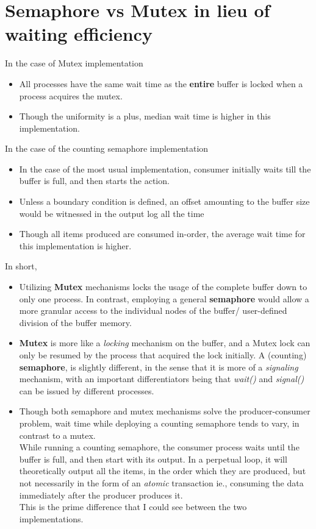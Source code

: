 \documentclass{article}
\begin{document}
\section{Semaphore vs Mutex in lieu of waiting efficiency}
In the case of Mutex implementation
    \begin{itemize}
        \item All processes have the same wait time as the \textbf{entire} buffer is locked when a process acquires the mutex.
        \item Though the uniformity is a plus, median wait time is higher in this implementation.
    \end{itemize}
In the case of the counting semaphore implementation
    \begin{itemize}
        \item In the case of the most usual implementation, consumer initially waits till the buffer is full, and then starts the action.
        \item Unless a boundary condition is defined, an offset amounting to the buffer size would be witnessed in the output log all the time
        \item Though all items produced are consumed in-order, the average wait time for this implementation is higher.
    \end{itemize}
    In short,
    \begin{itemize}
        \item Utilizing \textbf{Mutex} mechanisms locks the usage of the complete buffer down to only one process. In contrast, employing a general \textbf{semaphore} would allow a more granular access to the individual nodes of the buffer/ user-defined division of the buffer memory.
        \item \textbf{Mutex} is more like a \textit{locking} mechanism on the buffer, and a Mutex lock can only be resumed by the process that acquired the lock initially.
        A (counting) \textbf{semaphore}, is slightly different, in the sense that it is more of a \textit{signaling} mechanism, with an important differentiators being that \textit{wait()} and \textit{signal()} can be issued by different processes.
        \item Though both semaphore and mutex mechanisms solve the producer-consumer problem, wait time while deploying a counting semaphore tends to vary, in contrast to a mutex.\\
        While running a counting semaphore, the consumer process waits until the buffer is full, and then start with its output. In a perpetual loop, it will theoretically output all the items, in the order which they are produced, but not necessarily in the form of an \textit{atomic} transaction ie., consuming the data immediately after the producer produces it.\\
        This is the prime difference that I could see between the two implementations.  
    \end{itemize}
    
\end{document}
